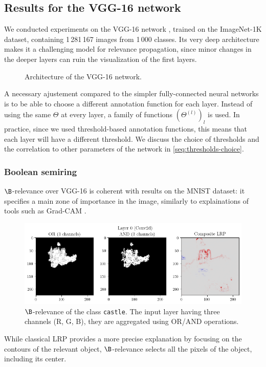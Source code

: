 \documentclass{../cs-classes/cs-classes}
\newcommand*{\1}{\digitsbb{1}}
\newcommand*{\0}{\digitsbb{0}}
\begin{document}
\subsection{Results for the VGG-16 network}
We conducted experiments on the VGG-16 network \cite{vgg}, trained on the ImageNet-1K dataset, containing 1\,281\,167 images from 1\,000 classes. Its very deep architecture makes it a challenging model for relevance propagation, since minor changes in the deeper layers can ruin the visualization of the first layers.
\begin{figure}[H]
    \centering
    
    \caption{Architecture of the VGG-16 network.}
\end{figure}
A necessary ajustement compared to the simpler fully-connected neural networks is to be able to choose a different annotation function for each layer. Instead of using the same $\Theta$ at every layer, a family of functions $(\Theta^{(l)})_l$ is used. In practice, since we used threshold-based annotation functions, this means that each layer will have a different threshold. We discuss the choice of thresholds and the correlation to other parameters of the network in \autoref{seq:thresholds-choice}.

\subsubsection{Boolean semiring}
$\B$-relevance over VGG-16 is coherent with results on the MNIST dataset: it specifies a main zone of importance in the image, similarly to explainations of tools such as Grad-CAM \cite{gradcam}.
\begin{figure}[H]
    \centering
    \includegraphics[width=.9\textwidth]{vgg-boolean.png}
    \caption{$\B$-relevance of the class \texttt{castle}. The input layer having three channels (R, G, B), they are aggregated using OR/AND operations.}
    \label{fig:vgg-boolean}
\end{figure}
While classical LRP provides a more precise explanation by focusing on the contours of the relevant object, $\B$-relevance selects all the pixels of the object, including its center.
\end{document}
